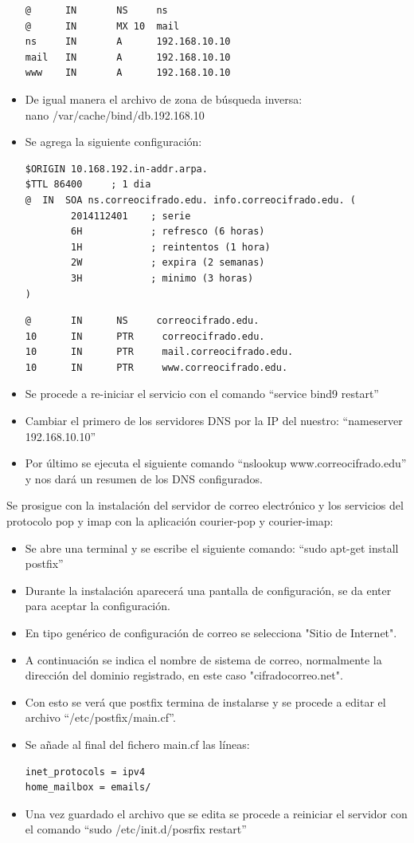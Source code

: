 \begin{itemize}
\begin{lstlisting}[frame=single]
@      IN       NS     ns
@      IN       MX 10  mail
ns     IN       A      192.168.10.10
mail   IN       A      192.168.10.10
www    IN       A      192.168.10.10
 \end{lstlisting}
 \item De igual manera el archivo de zona de búsqueda inversa:\\
  nano /var/cache/bind/db.192.168.10
  \item Se agrega la siguiente configuración:    
  \begin{lstlisting}[frame=single]
   $ORIGIN 10.168.192.in-addr.arpa.
$TTL 86400     ; 1 dia
@  IN  SOA ns.correocifrado.edu. info.correocifrado.edu. (
        2014112401    ; serie
        6H            ; refresco (6 horas)
        1H            ; reintentos (1 hora)
        2W            ; expira (2 semanas)
        3H            ; minimo (3 horas)
)
\end{lstlisting}
\begin{lstlisting}[frame=single]
@       IN      NS     correocifrado.edu.
10      IN      PTR     correocifrado.edu.
10      IN      PTR     mail.correocifrado.edu.
10      IN      PTR     www.correocifrado.edu.
  \end{lstlisting}
  \item Se procede a re-iniciar el servicio con el comando “service bind9 restart”
  \item Cambiar el primero de los servidores DNS por la IP del nuestro: “nameserver 192.168.10.10”
  \item Por último se ejecuta el siguiente comando “nslookup www.correocifrado.edu” y nos dará un resumen de los DNS configurados.
\end{itemize}
Se prosigue con la instalación del servidor de correo electrónico y los servicios del protocolo pop y imap con la aplicación courier-pop y courier-imap:
\begin{itemize}
 \item Se abre una terminal y se escribe el siguiente comando: “sudo apt-get install postfix”
 \item Durante la instalación aparecerá una pantalla de configuración, se da enter para aceptar la configuración.
 \item En tipo genérico de configuración de correo se selecciona "Sitio de Internet".
 \item A continuación se indica el nombre de sistema de correo, normalmente la dirección del dominio registrado, en este caso "cifradocorreo.net".
 \item Con esto se verá que postfix termina de instalarse y se procede a editar el archivo “/etc/postfix/main.cf”.
 \item Se añade al final del fichero main.cf las líneas:
 \begin{lstlisting}[frame=single]
  inet_protocols = ipv4
home_mailbox = emails/
 \end{lstlisting}
 \item Una vez guardado el archivo que se edita se procede a reiniciar el servidor con el comando “sudo /etc/init.d/posrfix restart”
\end{itemize}


